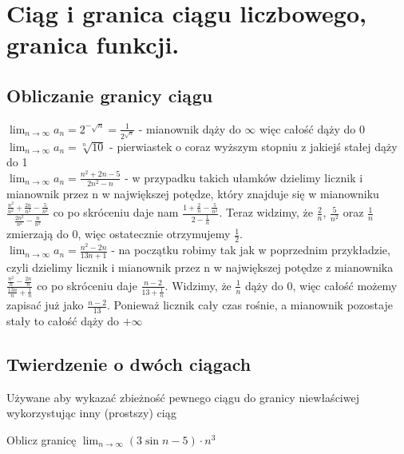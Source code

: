 \documentclass[12pt]{article}
\begin{document}
    \newpage

    \section{Ciąg i granica ciągu liczbowego, granica funkcji.}

    \subsection{Obliczanie granicy ciągu}
    $\lim_{n \to \infty} a_{n} = 2^{-\sqrt{n}} = \frac{1}{2^{\sqrt{n}}}$ - mianownik dąży do $\infty$ więc całość dąży do 0 \\

    \noindent $\lim_{n \to \infty} a_{n} = \sqrt[n]{10}$ - pierwiastek o coraz wyższym stopniu z jakiejś stałej dąży do 1 \\

    \noindent $\lim_{n \to \infty} a_{n} = \frac{n^{2} + 2n - 5}{2n^{2} - n}$ - w przypadku takich ułamków dzielimy licznik i mianownik przez n w największej potędze, który znajduje się w mianowniku
    $\frac{\frac{n^{2}}{n^{2}} + \frac{2n}{n^{2}} - \frac{5}{n^{2}}} {\frac{2n^{2}}{n^{2}} - \frac{n}{n^{2}}}$ co po skróceniu daje nam $\frac{1 + \frac{2}{n} - \frac{5}{n^{2}}} {2 - \frac{1}{n}}$.
    Teraz widzimy, że $\frac{2}{n}$, $\frac{5}{n^{2}}$ oraz $\frac{1}{n}$ zmierzają do 0, więc ostatecznie otrzymujemy $\frac{1}{2}$. \\

    \noindent $\lim_{n \to \infty} a_{n} = \frac{n^{2} - 2n}{13n + 1}$ - na początku robimy tak jak w poprzednim przykładzie, czyli dzielimy licznik i mianownik przez n w największej potędze z mianownika
    $\frac{\frac{n^{2}}{n} - \frac{2n}{n}} {\frac{13n}{n} + \frac{1}{n}}$ co po skróceniu daje $\frac{n - 2}{13 + \frac{1}{n}}$. Widzimy, że $\frac{1}{n}$ dąży do 0, więc całość możemy zapisać już jako
    $\frac{n - 2}{13}$. Ponieważ licznik cały czas rośnie, a mianownik pozostaje stały to całość dąży do $+\infty$


	\subsection{Twierdzenie o dwóch ciągach}

	Używane aby wykazać zbieżność pewnego ciągu do granicy niewłaściwej wykorzystując inny (prostszy) ciąg \\

	\begin{exercise}	
		Oblicz granicę $\lim_{n \to \infty} (3 \sin{n} - 5) \cdot n^{3}$ \\
	\end{exercise}
\end{document}
